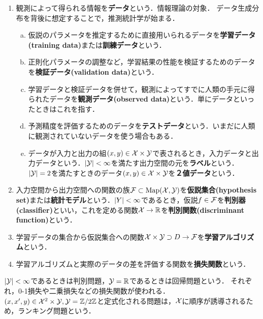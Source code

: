 \documentclass[uplatex,dvipdfmx]{jsreport}
\begin{document}
\begin{definition}[model]\mbox{}
    \begin{enumerate}
        \item 観測によって得られる情報を\textbf{データ}という．情報理論の対象．
        データ生成分布を背後に想定することで，推測統計学が始まる．
        \begin{enumerate}[(a)]
            \item 仮説のパラメータを推定するために直接用いられるデータを\textbf{学習データ(training data)}または\textbf{訓練データ}という．
            \item 正則化パラメータの調整など，学習結果の性能を検証するためのデータを\textbf{検証データ(validation data)}という．
            \item 学習データと検証データを併せて，観測によってすでに人類の手元に得られたデータを\textbf{観測データ(observed data)}という．単にデータといったときはこれを指す．
            \item 予測精度を評価するためのデータを\textbf{テストデータ}という．いまだに人類に観測されていないデータを使う場合もある．
            \item データが入力と出力の組$(x,y)\in\mathcal{X}\times\mathcal{Y}$で表されるとき，入力データと出力データという．$\lvert\mathcal{Y}\rvert<\infty$を満たす出力空間の元を\textbf{ラベル}という．$\lvert\mathcal{Y}\rvert=2$を満たすときのデータ$(x,y)\in\mathcal{X}\times\mathcal{Y}$を\textbf{２値データ}という．
        \end{enumerate}
        \item 入力空間から出力空間への関数の族$\mathcal{F}\subset\mathrm{Map}(\mathcal{X},\mathcal{Y})$を\textbf{仮説集合(hypothesis set)}または\textbf{統計モデル}という．$\lvert Y\rvert<\infty$であるとき，仮説$f\in\mathcal{F}$を\textbf{判別器(classifier)}といい，これを定める関数$\mathcal{X}\to\mathbb{R}$を\textbf{判別関数(discriminant function)}という．
        \item 学習データの集合から仮説集合への関数$\mathcal{X}\times\mathcal{Y}\supset D\to\mathcal{F}$を\textbf{学習アルゴリズム}という．
        \item 学習アルゴリズムと実際のデータの差を評価する関数を\textbf{損失関数}という．
    \end{enumerate}
\end{definition}
\begin{example}
    $\lvert\mathcal{Y}\rvert<\infty$であるときは判別問題，$\mathcal{Y}=\mathbb{R}$であるときは回帰問題という．
    それぞれ，0-1損失や二乗損失などの損失関数が使われる．$(x,x',y)\in\mathcal{X}^2\times\mathcal{Y},\mathcal{Y}=\mathbb{Z}/2\mathbb{Z}$と定式化される問題は，$\mathcal{X}$に順序が誘導されるため，ランキング問題という．
\end{example}
\end{document}
